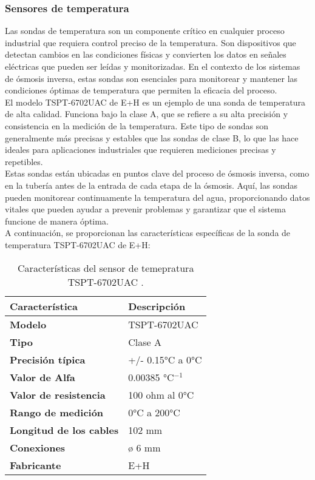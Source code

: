 \subsubsection{Sensores de temperatura}

Las sondas de temperatura son un componente crítico en cualquier proceso industrial que requiera control preciso de la temperatura. Son dispositivos que detectan cambios en las condiciones físicas y convierten los datos en señales eléctricas que pueden ser leídas y monitorizadas. En el contexto de los sistemas de ósmosis inversa, estas sondas son esenciales para monitorear y mantener las condiciones óptimas de temperatura que permiten la eficacia del proceso.\\

El modelo TSPT-6702UAC de E+H es un ejemplo de una sonda de temperatura de alta calidad. Funciona bajo la clase A, que se refiere a su alta precisión y consistencia en la medición de la temperatura. Este tipo de sondas son generalmente más precisas y estables que las sondas de clase B, lo que las hace ideales para aplicaciones industriales que requieren mediciones precisas y repetibles.\\

Estas sondas están ubicadas en puntos clave del proceso de ósmosis inversa, como en la tubería antes de la entrada de cada etapa de la ósmosis. Aquí, las sondas pueden monitorear continuamente la temperatura del agua, proporcionando datos vitales que pueden ayudar a prevenir problemas y garantizar que el sistema funcione de manera óptima.\\

A continuación, se proporcionan las características específicas de la sonda de temperatura TSPT-6702UAC de E+H:\\


\begin{table}[H]
    \centering
    \caption{Características del sensor de temepratura TSPT-6702UAC .}
    \label{table:sensor_4}
    \begin{tabular}{| L{5cm} | L{5cm} |}
        \hline
        \textbf{Característica} & \textbf{Descripción}  \\
        \hline
        \textbf{Modelo} & TSPT-6702UAC  \\
        \hline
        \textbf{Tipo} & Clase A  \\
        \hline
        \textbf{Precisión típica} & +/- 0.15°C a 0°C  \\
        \hline
        \textbf{Valor de Alfa} & 0.00385 °C$^{-1}$ \\
        \hline
        \textbf{Valor de resistencia} & 100 ohm al 0°C  \\
        \hline
        \textbf{Rango de medición} & 0°C a 200°C  \\
        \hline
        \textbf{Longitud de los cables} & 102 mm  \\
        \hline
        \textbf{Conexiones} & ø 6 mm  \\
        \hline
        \textbf{Fabricante} & E+H  \\
        \hline
    \end{tabular}
\end{table}

